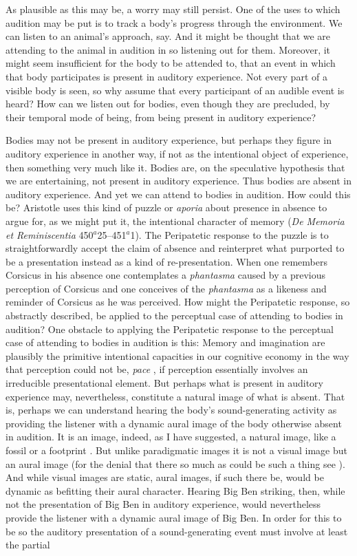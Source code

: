 As plausible as this may be, a worry may still persist. One of the uses to which audition may be put is to track a body's progress through the environment. We can listen to an animal's approach, say. And it might be thought that we are attending to the animal in audition in so listening out for them. Moreover, it might seem insufficient for the body to be attended to, that an event in which that body participates is present in auditory experience. Not every part of a visible body is seen, so why assume that every participant of an audible event is heard? How can we listen out for bodies, even though they are precluded, by their temporal mode of being, from being present in auditory experience? 

Bodies may not be present in auditory experience, but perhaps they figure in auditory experience in another way, if not as the intentional object of experience, then something very much like it. Bodies are, on the speculative hypothesis that we are entertaining, not present in auditory experience. Thus bodies are absent in auditory experience. And yet we can attend to bodies in audition. How could this be? Aristotle uses this kind of puzzle or \emph{aporia} about presence in absence to argue for, as we might put it, the intentional character of memory (\emph{De Memoria et Reminiscentia} 450\( ^{a} \)25--451\( ^{a} \)1). The Peripatetic response to the puzzle is to straightforwardly accept the claim of absence and reinterpret what purported to be a presentation instead as a kind of re-presentation. When one remembers Corsicus in his absence one contemplates a \emph{phantasma} caused by a previous perception of Corsicus and one conceives of the \emph{phantasma} as a likeness and reminder of Corsicus as he was perceived. How might the Peripatetic response, so abstractly described, be applied to the perceptual case of attending to bodies in audition? One obstacle to applying the Peripatetic response to the perceptual case of attending to bodies in audition is this: Memory and imagination are plausibly the primitive intentional capacities in our cognitive economy in the way that perception could not be, \emph{pace} \citet{Burge:2010uq}, if perception essentially involves an irreducible presentational element. But perhaps what is present in auditory experience may, nevertheless, constitute a natural image of what is absent. That is, perhaps we can understand hearing the body's sound-generating activity as providing the listener with a dynamic aural image of the body otherwise absent in audition. It is an image, indeed, as I have suggested, a natural image, like a fossil or a footprint \citep[for a recent general discussion of images see][]{Kulvicki:2014hb}. But unlike paradigmatic images it is not a visual image but an aural image (for the denial that there so much as could be such a thing see \citealt{Martin:2012af}). And while visual images are static, aural images, if such there be, would be dynamic as befitting their aural character. Hearing Big Ben striking, then, while not the presentation of Big Ben in auditory experience, would nevertheless provide the listener with a dynamic aural image of Big Ben. In order for this to be so the auditory presentation of a sound-generating event must involve at least the partial 